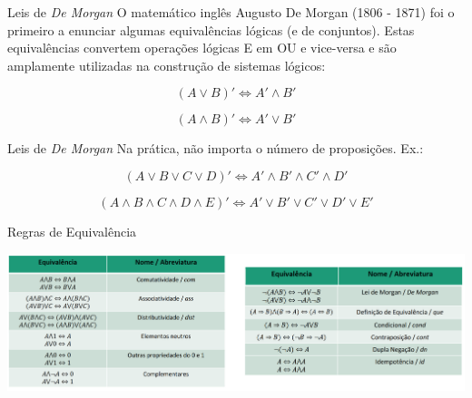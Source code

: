\documentclass[aspectratio=169]{beamer}
\begin{document}
\begin{frame}{Leis de \textit{De Morgan}}
    O matemático inglês Augusto De Morgan (1806 - 1871) foi o primeiro a enunciar algumas equivalências lógicas
    (e de conjuntos). Estas equivalências convertem operações lógicas E em OU e vice-versa e são amplamente utilizadas
    na construção de sistemas lógicos:

    \textbf{\[ (A \vee B)' \iff A' \wedge B' \]}

    \vspace{5mm}

    \textbf{\[ (A \wedge B)' \iff A' \vee B' \]}

\end{frame}

\begin{frame}{Leis de \textit{De Morgan}}
    Na prática, não importa o número de proposições. Ex.:

    \vspace{5mm}

    \textbf{\[ (A \vee B \vee C \vee D)' \iff A' \wedge B' \wedge C' \wedge D' \]}

    \vspace{5mm}

    \textbf{\[ (A \wedge B \wedge C \wedge D \wedge E)' \iff A' \vee B' \vee C' \vee D' \vee E' \]}

\end{frame}

\begin{frame}{Regras de Equivalência}

    \begin{center}
        \includegraphics[width=.9\linewidth]{figs/equivalencias.png}
    \end{center}

\end{frame}
\end{document}
